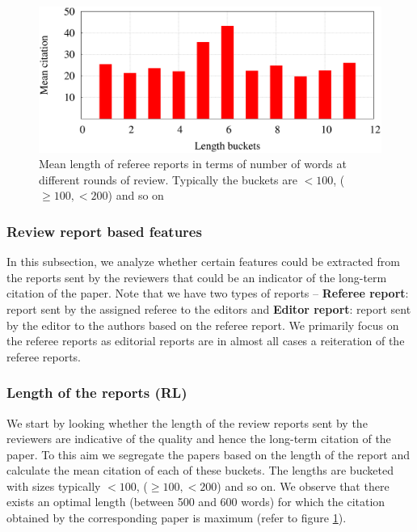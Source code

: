 \begin{figure}
\centering
\includegraphics[scale=0.25]{./texfiles/Chapter_4/jcdl/figures/len_citation.eps}
\caption{Mean length of referee reports in terms of number of words at different rounds of review. Typically the buckets are $< 100$, ($\geq 100, < 200$) and so on}
\label{fig:length}
\vspace{3mm}
\end{figure}


\subsubsection{Review report based features}
\label{text_analysis}

In this subsection, we analyze whether certain features could be extracted from the reports sent by the reviewers that could be an indicator of the long-term citation of the paper. Note that we have two types of reports -- {\bf Referee report}: report sent by the assigned referee to the editors and {\bf Editor report}: report sent by the editor to the authors based on the referee report. We primarily focus on the referee reports as editorial reports are in almost all cases a reiteration of the referee reports.

\subsubsection*{Length of the reports (RL)}
We start by looking whether the length of the review reports sent by the reviewers are indicative of the quality and hence the long-term citation of the paper. To this aim we segregate the papers based on the length of the report and calculate the mean citation of each of these buckets. The lengths are bucketed with sizes typically $< 100$, ($\geq 100, < 200$) and so on. We observe that there exists an optimal length (between 500 and 600 words) for which the citation obtained by the corresponding paper is maximum  (refer to figure \ref{fig:length}). 


